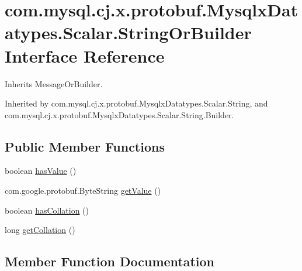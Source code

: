 \hypertarget{interfacecom_1_1mysql_1_1cj_1_1x_1_1protobuf_1_1_mysqlx_datatypes_1_1_scalar_1_1_string_or_builder}{}\section{com.\+mysql.\+cj.\+x.\+protobuf.\+Mysqlx\+Datatypes.\+Scalar.\+String\+Or\+Builder Interface Reference}
\label{interfacecom_1_1mysql_1_1cj_1_1x_1_1protobuf_1_1_mysqlx_datatypes_1_1_scalar_1_1_string_or_builder}


Inherits Message\+Or\+Builder.



Inherited by com.\+mysql.\+cj.\+x.\+protobuf.\+Mysqlx\+Datatypes.\+Scalar.\+String, and com.\+mysql.\+cj.\+x.\+protobuf.\+Mysqlx\+Datatypes.\+Scalar.\+String.\+Builder.

\subsection*{Public Member Functions}
\begin{DoxyCompactItemize}
\item 
boolean \mbox{\hyperlink{interfacecom_1_1mysql_1_1cj_1_1x_1_1protobuf_1_1_mysqlx_datatypes_1_1_scalar_1_1_string_or_builder_a08394cea2016128a422efdf2fea938e8}{has\+Value}} ()
\item 
com.\+google.\+protobuf.\+Byte\+String \mbox{\hyperlink{interfacecom_1_1mysql_1_1cj_1_1x_1_1protobuf_1_1_mysqlx_datatypes_1_1_scalar_1_1_string_or_builder_a27dbf90fb92b95238f4386a9e09ce07f}{get\+Value}} ()
\item 
boolean \mbox{\hyperlink{interfacecom_1_1mysql_1_1cj_1_1x_1_1protobuf_1_1_mysqlx_datatypes_1_1_scalar_1_1_string_or_builder_a69106b69034ab73eecf7a2520c752992}{has\+Collation}} ()
\item 
long \mbox{\hyperlink{interfacecom_1_1mysql_1_1cj_1_1x_1_1protobuf_1_1_mysqlx_datatypes_1_1_scalar_1_1_string_or_builder_a043ac515cd2787274fddc4e8017498c3}{get\+Collation}} ()
\end{DoxyCompactItemize}


\subsection{Member Function Documentation}
\mbox{\label{interfacecom_1_1mysql_1_1cj_1_1x_1_1protobuf_1_1_mysqlx_datatypes_1_1_scalar_1_1_string_or_builder_a043ac515cd2787274fddc4e8017498c3}} 
